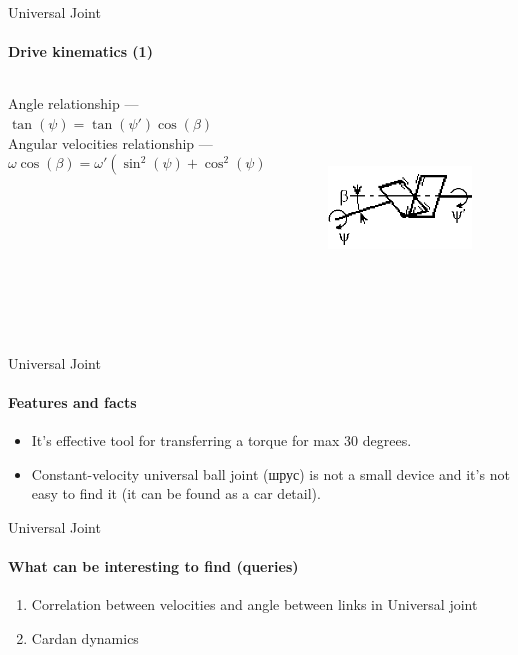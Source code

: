 \documentclass[aspectratio=169]{beamer}
\begin{document}
\begin{frame}[t]{Universal Joint}
    \framesubtitle{Drive kinematics (1)}
    \begin{columns}[T,onlytextwidth]
        \begin{column}{0.59\textwidth}
            Angle relationship --- $\tan(\psi)=\tan(\psi')\cos(\beta)$ \\
            Angular velocities relationship --- $ \omega \cos(\beta) = \omega'(\sin^2(\psi) + \cos^2(\psi)\cos^2(\beta))$
        \end{column}
        \begin{column}{0.39\textwidth}
            \vspace{-0.9cm}
            \begin{figure}[H]
                \centering\includegraphics[height=6cm,width=1\textwidth,keepaspectratio]{universal_kinematics.png}
                \label{fig:universal_kinematics.png}
            \end{figure}
        \end{column}
    \end{columns}

\end{frame}

\begin{frame}[t]{Universal Joint}
    \framesubtitle{Features and facts}
    \begin{itemize}
        \item It's effective tool for transferring a torque for max 30 degrees.
        \item Constant-velocity universal ball joint (шрус) is not a small device and it's not easy to find it (it can be found as a car detail).
    \end{itemize}
\end{frame}

\begin{frame}[t]{Universal Joint}
    \framesubtitle{What can be interesting to find (queries)}
    \begin{enumerate}
        \item Correlation between velocities and angle between links in Universal joint
        \item Cardan dynamics
    \end{enumerate}
\end{frame}
\end{document}
